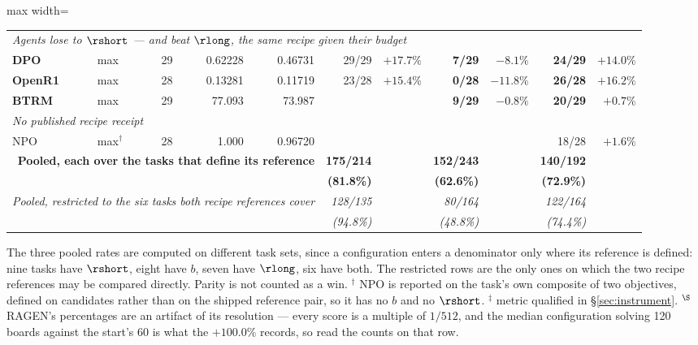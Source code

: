 \begin{table}[t]
\begin{adjustbox}{max width=\linewidth}
\begin{tabular}{llrrrrrrrrr}
\midrule
\multicolumn{11}{l}{\emph{Agents lose to $\rshort$ --- and beat $\rlong$, the same recipe given their budget}} \\
\textbf{DPO}     & max & 29 & 0.62228 & 0.46731 & 29/29 & $+17.7\%$ & \textbf{7/29} & $-8.1\%$ & \textbf{24/29} & $+14.0\%$ \\
\textbf{OpenR1}  & max & 28 & 0.13281 & 0.11719 & 23/28 & $+15.4\%$ & \textbf{0/28} & $-11.8\%$ & \textbf{26/28} & $+16.2\%$ \\
\textbf{BTRM}    & max & 29 & 77.093 & 73.987 & \na{} & \na{} & \textbf{9/29} & $-0.8\%$ & \textbf{20/29} & $+0.7\%$ \\
\midrule
\multicolumn{11}{l}{\emph{No published recipe receipt}} \\
NPO              & max$^\dagger$ & 28 & 1.000 & 0.96720 & \na{} & \na{} & \na{} & \na{} & 18/28 & $+1.6\%$ \\
\midrule
\multicolumn{5}{r}{\textbf{Pooled, each over the tasks that define its reference}}
& \textbf{175/214} & & \textbf{152/243} & & \textbf{140/192} & \\
\multicolumn{5}{r}{}
& \textbf{(81.8\%)} & & \textbf{(62.6\%)} & & \textbf{(72.9\%)} & \\
\multicolumn{5}{r}{\emph{Pooled, restricted to the six tasks both recipe references cover}}
& \emph{128/135} & & \emph{80/164} & & \emph{122/164} & \\
\multicolumn{5}{r}{}
& \emph{(94.8\%)} & & \emph{(48.8\%)} & & \emph{(74.4\%)} & \\
\bottomrule
\end{tabular}
\end{adjustbox}
\par\vspace{2pt}
{\footnotesize The three pooled rates are computed on different task sets, since a configuration enters
a denominator only where its reference is defined: nine tasks have $\rshort$, eight have $b$, seven have
$\rlong$, six have both. The restricted rows are the only ones on which the two recipe references may be
compared directly. Parity is not counted as a win. $^\dagger$ NPO is reported on the task's own
composite of two objectives, defined on candidates rather than on the shipped reference pair, so it has
no $b$ and no $\rshort$. $^\ddagger$ metric qualified in \S\ref{sec:instrument}. $^\S$ RAGEN's
percentages are an artifact of its resolution --- every score is a multiple of $1/512$, and the median
configuration solving 120 boards against the start's 60 is what the $+100.0\%$ records, so read the
counts on that row.}
\end{table}
